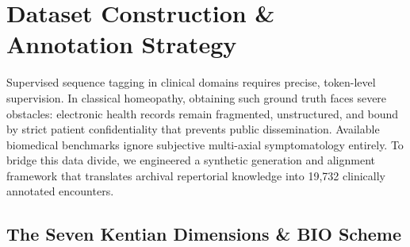 \section{Dataset Construction \& Annotation Strategy}
\label{sec:dataset}

Supervised sequence tagging in clinical domains requires precise, token-level supervision. In classical homeopathy, obtaining such ground truth faces severe obstacles: electronic health records remain fragmented, unstructured, and bound by strict patient confidentiality that prevents public dissemination. Available biomedical benchmarks ignore subjective multi-axial symptomatology entirely. To bridge this data divide, we engineered a synthetic generation and alignment framework that translates archival repertorial knowledge into 19,732 clinically annotated encounters.

\subsection{The Seven Kentian Dimensions \& BIO Scheme}

